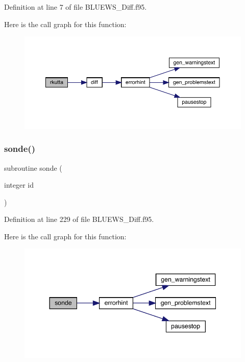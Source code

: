 Definition at line 7 of file B\+L\+U\+E\+W\+S\+\_\+\+Diff.\+f95.

Here is the call graph for this function\+:\nopagebreak
\begin{figure}[H]
\begin{center}
\leavevmode
\includegraphics[width=350pt]{_b_l_u_e_w_s___diff_8f95_aa6b01ddf379446848f8a822a7918fcd0_cgraph}
\end{center}
\end{figure}
\mbox{\label{_b_l_u_e_w_s___diff_8f95_a63eab50bdd789005154d787035910277}} 
\subsubsection{\texorpdfstring{sonde()}{sonde()}}
{\footnotesize\ttfamily subroutine sonde (\begin{DoxyParamCaption}\item[{integer}]{id }\end{DoxyParamCaption})}



Definition at line 229 of file B\+L\+U\+E\+W\+S\+\_\+\+Diff.\+f95.

Here is the call graph for this function\+:\nopagebreak
\begin{figure}[H]
\begin{center}
\leavevmode
\includegraphics[width=344pt]{_b_l_u_e_w_s___diff_8f95_a63eab50bdd789005154d787035910277_cgraph}
\end{center}
\end{figure}

